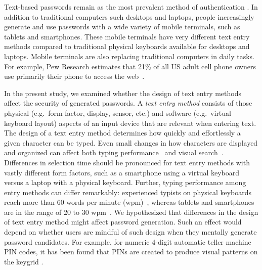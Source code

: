 \documentclass[conference]{IEEEtran}
\begin{document}
Text-based passwords remain as the most prevalent method of authentication \cite{Herley:2012:RAA:2360743.2360824}. 
In addition to traditional computers such desktops and laptops, people increasingly generate and use passwords with a wide variety of mobile terminals, such as tablets and smartphones. These mobile terminals have very different text entry methods compared to traditional physical keyboards available for desktops and laptops. Mobile terminals are also replacing traditional computers in daily tasks. For example, Pew Research estimates that 21\% of all US adult cell phone owners use primarily their phone to access the web~\cite{cellinternet2013}.


In the present study, we examined whether the design of text entry methods affect the security of generated passwords. A \emph{text entry method} \cite{MacKenzie:2007:TES:1296062} consists of those physical (e.g.~form factor, display, sensor, etc.) and software (e.g.~virtual keyboard layout) aspects of an input device that are relevant when entering text.
The design of a text entry method determines how quickly and effortlessly a given character can be typed. 
Even small changes in how characters are displayed and organized can affect both typing performance~\cite{zhai2002performance} and visual search~\cite{norman1982alphabetic}. 
Differences in selection time should be pronounced for text entry methods with vastly different form factors, such as a smartphone using a virtual keyboard versus a laptop with a physical keyboard. Further, typing performance among entry methods can differ remarkably: experienced typists on physical keyboards reach more than 60 words per minute (wpm)~\cite{gentner1983acquisition}, whereas tablets and smartphones are in the range of 20 to 30 wpm~\cite{goel2012walktype, oulasvirta2013improving}. 
We hypothesized that differences in the design of text entry method might affect password generation.
Such an effect would depend on whether users are mindful of such design when they mentally generate password candidates. For example, for numeric 4-digit automatic teller machine PIN codes, it has been found that PINs are created to produce visual patterns on the keygrid \cite{bonneauPINs}.
\end{document}

